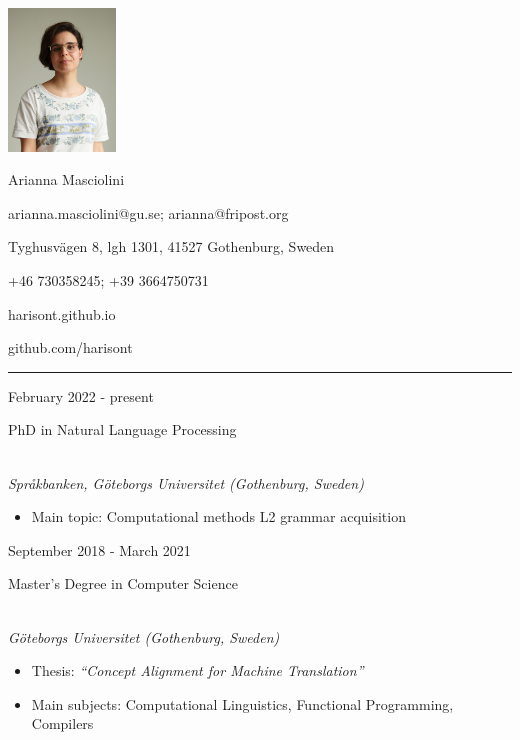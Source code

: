 \documentclass[a4paper,10pt]{article}
\newlength{\cvcolumngapwidth}
\newlength{\cvleftcolumnwidth}
\newlength{\cvrightcolumnwidth}
\newcommand{\cvnamestyle}[1]{{\Large\cvnamefont\textcolor{cvnamecolor}{#1}}}
\newcommand{\cvsectionstyle}[1]{{\normalsize\cvsectionfont\textcolor{cvsectioncolor}{#1}}}
\newcommand{\cvtitlestyle}[1]{{\large\cvtitlefont\textcolor{cvtitlecolor}{#1}}}
\newcommand{\cvdurationstyle}[1]{{\small\cvdurationfont\textcolor{cvdurationcolor}{#1}}}
\newlength{\cvafteritemskipamount}
\newlength{\cvaftersectionskipamount}
\newlength{\cvafternameskipamount}
\newlength{\cvafterpersonalinfolineskipamount}
\newlength{\cvaftertitleskipamount}
\newlength{\cvparskip}
\newcommand{\cvpersonalinfo}[2]{
    \begin{minipage}[t]{\cvleftcolumnwidth}
        \vspace{0mm} %
        \raggedleft #1
    \end{minipage}%
    \hspace{\cvcolumngapwidth}%
    \begin{minipage}[t]{\cvrightcolumnwidth}
        \vspace{0mm} %
        #2
    \end{minipage}

    \vspace{\cvafteritemskipamount}
}
\newcommand{\cvname}[1]{
    \cvnamestyle{#1}

    \vspace{\cvafternameskipamount}
}
\newcommand{\cvpersonalinfolinewithicon}[3]{
    \raisebox{.5\fontcharht\font`E-.5\height}{\texttt{[image: \#2]}}
    #3

    \vspace{\cvafterpersonalinfolineskipamount}
}
\newcommand{\cvsection}[1]{
    \begin{minipage}[t]{\cvleftcolumnwidth}
        \raggedleft\cvsectionstyle{#1}
    \end{minipage}%
    \hspace{\cvcolumngapwidth}%
    \begin{minipage}[t]{\cvrightcolumnwidth}
        \textcolor{cvrulecolor}{\rule{\cvrightcolumnwidth}{0.3mm}}
    \end{minipage}

    \vspace{\cvaftersectionskipamount}
}
\newcommand{\cvitem}[2]{
    \begin{minipage}[t]{\cvleftcolumnwidth}
        \raggedleft #1
    \end{minipage}%
    \hspace{\cvcolumngapwidth}%
    \begin{minipage}[t]{\cvrightcolumnwidth}
        \setlength{\parskip}{\cvparskip} #2
    \end{minipage}

    \vspace{\cvafteritemskipamount}
}
\newcommand{\cvtitle}[1]{
    \cvtitlestyle{#1}

    \vspace{\cvaftertitleskipamount}
    \vspace{-\cvparskip}
}
\begin{document}

\cvpersonalinfo{
    \includegraphics[height=38mm]{picture.JPG}
}{
    \cvname{Arianna Masciolini}

    \cvpersonalinfolinewithicon{height=4mm}{070-envelop.pdf}{
        arianna.masciolini@gu.se;
        arianna@fripost.org
    }

    \cvpersonalinfolinewithicon{height=4mm}{072-location.pdf}{
        Tyghusvägen 8, lgh 1301, 41527 Gothenburg, Sweden
    }

    \cvpersonalinfolinewithicon{height=4mm}{067-phone.pdf}{
        +46 730358245;
        +39 3664750731
    }
    
    \cvpersonalinfolinewithicon{height=4mm}{website.pdf}{
        harisont.github.io
    }
    
    \cvpersonalinfolinewithicon{height=4mm}{github.pdf}{
        github.com/harisont
    }

}


\cvsection{EDUCATION}

\cvitem{
    \cvdurationstyle{February 2022 - present}%
}{
    \cvtitle{PhD in Natural Language Processing}
    \\
    \textit{Språkbanken, Göteborgs Universitet (Gothenburg, Sweden)}
    \begin{itemize}[leftmargin=*]
        \item Main topic: Computational methods L2 grammar acquisition
    \end{itemize}
}

\cvitem{
    \cvdurationstyle{September 2018 - March 2021}%
}{
    \cvtitle{Master's Degree in Computer Science}
    \\
    \textit{Göteborgs Universitet (Gothenburg, Sweden)}
    \begin{itemize}[leftmargin=*]
        \item Thesis: \textit{``Concept Alignment for Machine Translation''}
        \item Main subjects: Computational Linguistics, Functional Programming, Compilers
    \end{itemize}
}
\end{document}
